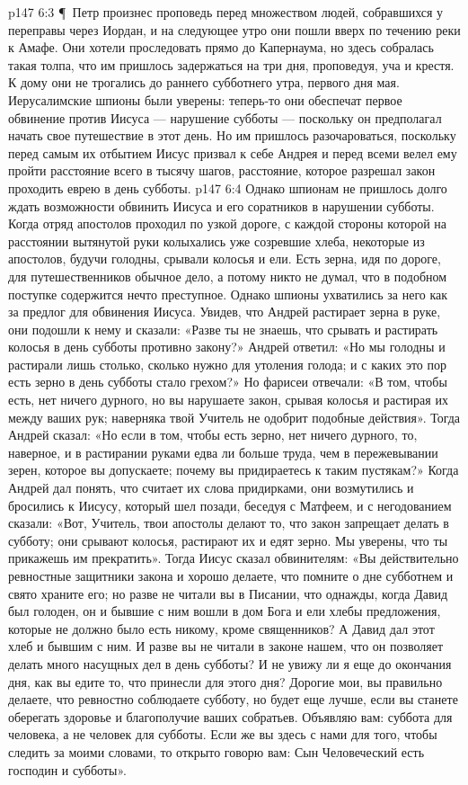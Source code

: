 \vs p147 6:3 \P\ Петр произнес проповедь перед множеством людей, собравшихся у переправы через Иордан, и на следующее утро они пошли вверх по течению реки к Амафе. Они хотели проследовать прямо до Капернаума, но здесь собралась такая толпа, что им пришлось задержаться на три дня, проповедуя, уча и крестя. К дому они не трогались до раннего субботнего утра, первого дня мая. Иерусалимские шпионы были уверены: теперь\hyp{}то они обеспечат первое обвинение против Иисуса --- нарушение субботы --- поскольку он предполагал начать свое путешествие в этот день. Но им пришлось разочароваться, поскольку перед самым их отбытием Иисус призвал к себе Андрея и перед всеми велел ему пройти расстояние всего в тысячу шагов, расстояние, которое разрешал закон проходить еврею в день субботы.
\vs p147 6:4 Однако шпионам не пришлось долго ждать возможности обвинить Иисуса и его соратников в нарушении субботы. Когда отряд апостолов проходил по узкой дороге, с каждой стороны которой на расстоянии вытянутой руки колыхались уже созревшие хлеба, некоторые из апостолов, будучи голодны, срывали колосья и ели. Есть зерна, идя по дороге, для путешественников обычное дело, а потому никто не думал, что в подобном поступке содержится нечто преступное. Однако шпионы ухватились за него как за предлог для обвинения Иисуса. Увидев, что Андрей растирает зерна в руке, они подошли к нему и сказали: «Разве ты не знаешь, что срывать и растирать колосья в день субботы противно закону?» Андрей ответил: «Но мы голодны и растирали лишь столько, сколько нужно для утоления голода; и с каких это пор есть зерно в день субботы стало грехом?» Но фарисеи отвечали: «В том, чтобы есть, нет ничего дурного, но вы нарушаете закон, срывая колосья и растирая их между ваших рук; наверняка твой Учитель не одобрит подобные действия». Тогда Андрей сказал: «Но если в том, чтобы есть зерно, нет ничего дурного, то, наверное, и в растирании руками едва ли больше труда, чем в пережевывании зерен, которое вы допускаете; почему вы придираетесь к таким пустякам?» Когда Андрей дал понять, что считает их слова придирками, они возмутились и бросились к Иисусу, который шел позади, беседуя с Матфеем, и с негодованием сказали: «Вот, Учитель, твои апостолы делают то, что закон запрещает делать в субботу; они срывают колосья, растирают их и едят зерно. Мы уверены, что ты прикажешь им прекратить». Тогда Иисус сказал обвинителям: «Вы действительно ревностные защитники закона и хорошо делаете, что помните о дне субботнем и свято храните его; но разве не читали вы в Писании, что однажды, когда Давид был голоден, он и бывшие с ним вошли в дом Бога и ели хлебы предложения, которые не должно было есть никому, кроме священников? А Давид дал этот хлеб и бывшим с ним. И разве вы не читали в законе нашем, что он позволяет делать много насущных дел в день субботы? И не увижу ли я еще до окончания дня, как вы едите то, что принесли для этого дня? Дорогие мои, вы правильно делаете, что ревностно соблюдаете субботу, но будет еще лучше, если вы станете оберегать здоровье и благополучие ваших собратьев. Объявляю вам: суббота для человека, а не человек для субботы. Если же вы здесь с нами для того, чтобы следить за моими словами, то открыто говорю вам: Сын Человеческий есть господин и субботы».
